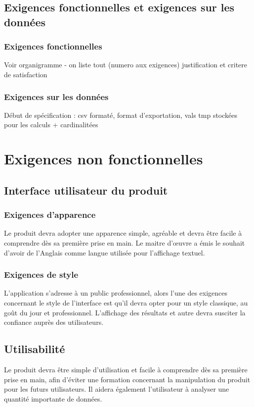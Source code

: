 		\subsection{Exigences fonctionnelles et exigences sur les données}
		
			\subsubsection{Exigences fonctionnelles}
				{\color{red} Voir organigramme - on liste tout (numero aux exigences) justification et critere de satisfaction }
				
			\subsubsection{Exigences sur les données}
				{\color{red} Début de spécification : csv formaté, format d'exportation, vals tmp stockées pour les calculs + cardinalitées}
	
	
	\section{Exigences non fonctionnelles}
		\subsection{Interface utilisateur du produit}
		
			\subsubsection{Exigences d’apparence} 
			Le produit devra adopter une apparence simple, agréable et devra être facile à comprendre dès sa première prise en main.
			Le maitre d’œuvre a émis le souhait d’avoir de l’Anglais comme langue utilisée pour l’affichage textuel.

			\subsubsection{Exigences de style}
			L’application s’adresse à un public professionnel, alors l’une des exigences concernant le style de l’interface est qu’il devra opter pour un style classique, au goût du jour et professionnel. L’affichage des résultats et autre devra susciter la confiance auprès des utilisateurs.

		\subsection{Utilisabilité}
		Le produit devra être simple d’utilisation et facile à comprendre dès sa première prise en main, afin d’éviter une formation concernant la manipulation du produit pour les futurs utilisateurs.
		Il aidera également l’utilisateur à analyser une quantité importante de données.

